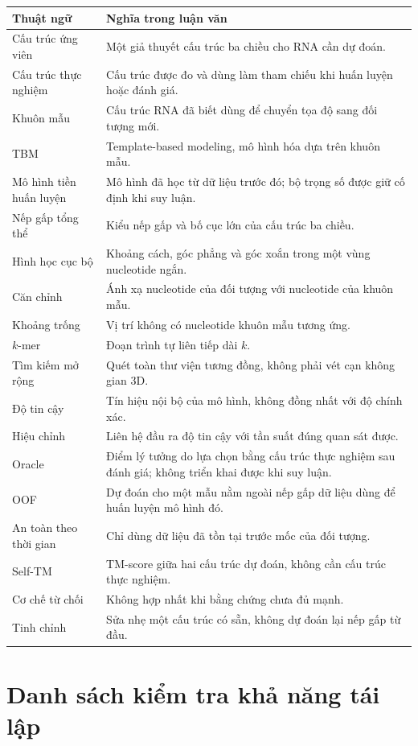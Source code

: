 \documentclass[12pt,a4paper,oneside]{report}
\begin{document}
\begin{longtable}{p{}p{}}
\toprule
Thuật ngữ & Nghĩa trong luận văn\\
\midrule
\endhead
Cấu trúc ứng viên & Một giả thuyết cấu trúc ba chiều cho RNA cần dự đoán.\\
Cấu trúc thực nghiệm & Cấu trúc được đo và dùng làm tham chiếu khi huấn luyện hoặc đánh giá.\\
Khuôn mẫu & Cấu trúc RNA đã biết dùng để chuyển tọa độ sang đối tượng mới.\\
TBM & Template-based modeling, mô hình hóa dựa trên khuôn mẫu.\\
Mô hình tiền huấn luyện & Mô hình đã học từ dữ liệu trước đó; bộ trọng số được giữ cố định khi suy luận.\\
Nếp gấp tổng thể & Kiểu nếp gấp và bố cục lớn của cấu trúc ba chiều.\\
Hình học cục bộ & Khoảng cách, góc phẳng và góc xoắn trong một vùng nucleotide ngắn.\\
Căn chỉnh & Ánh xạ nucleotide của đối tượng với nucleotide của khuôn mẫu.\\
Khoảng trống & Vị trí không có nucleotide khuôn mẫu tương ứng.\\
$k$-mer & Đoạn trình tự liên tiếp dài $k$.\\
Tìm kiếm mở rộng & Quét toàn thư viện tương đồng, không phải vét cạn không gian 3D.\\
Độ tin cậy & Tín hiệu nội bộ của mô hình, không đồng nhất với độ chính xác.\\
Hiệu chỉnh & Liên hệ đầu ra độ tin cậy với tần suất đúng quan sát được.\\
Oracle & Điểm lý tưởng do lựa chọn bằng cấu trúc thực nghiệm sau đánh giá; không triển khai được khi suy luận.\\
OOF & Dự đoán cho một mẫu nằm ngoài nếp gấp dữ liệu dùng để huấn luyện mô hình đó.\\
An toàn theo thời gian & Chỉ dùng dữ liệu đã tồn tại trước mốc của đối tượng.\\
Self-TM & TM-score giữa hai cấu trúc dự đoán, không cần cấu trúc thực nghiệm.\\
Cơ chế từ chối & Không hợp nhất khi bằng chứng chưa đủ mạnh.\\
Tinh chỉnh & Sửa nhẹ một cấu trúc có sẵn, không dự đoán lại nếp gấp từ đầu.\\
\bottomrule
\end{longtable}

\chapter{Danh sách kiểm tra khả năng tái lập}
\end{document}
